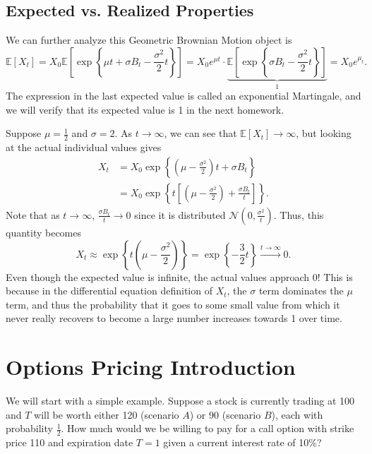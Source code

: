 \subsection{Expected vs. Realized Properties}
We can further analyze this Geometric Brownian Motion object is $$ \mathbb E[X_t] = X_0 \mathbb E \left[ \exp\left\{\mu t+\sigma B_t - \frac{\sigma^2}{2}t\right\} \right] = X_0 e^{\mu t} \cdot \underbrace{\mathbb E \left[ \exp \left\{ \sigma B_t - \frac{\sigma^2}{2} t \right\}  \right]}_{1} = X_0 e^{\mu_t}. $$ The expression in the last expected value is called an exponential Martingale, and we will verify that its expected value is 1 in the next homework. 

Suppose $\mu=\frac{1}{2}$ and $\sigma=2$. As $t\to\infty$, we can see that $\mathbb E[X_t]\to\infty$, but looking at the actual individual values gives \begin{align*} X_t &= X_0\exp \left\{ \left( \mu-\frac{\sigma^2}{2} \right) t + \sigma B_t \right\} \\
		&= X_0 \exp \left\{ t \left[ \left( \mu-\frac{\sigma^2}{2} \right) + \frac{\sigma B_t}{t} \right]  \right\} .
\end{align*} Note that as $t\to\infty$, $\frac{\sigma B_t}{t}\to 0$ since it is distributed $\mathcal N \left( 0,\frac{\sigma^2}{t} \right)$. Thus, this quantity becomes $$ X_t\approx \exp \left\{ t \left( \mu-\frac{\sigma^2}{2} \right)  \right\} = \exp \left\{ -\frac{3}{2}t \right\} \overset{t\to\infty}{\longrightarrow} 0. $$ Even though the expected value is infinite, the actual values approach 0! This is because in the differential equation definition of $X_t$, the $\sigma$ term dominates the $\mu$ term, and thus the probability that it goes to some small value from which it never really recovers to become a large number increases towards 1 over time.

\section{Options Pricing Introduction}
We will start with a simple example. Suppose a stock is currently trading at 100 and $T$ will be worth either 120 (scenario $A$) or 90 (scenario $B$), each with probability $\frac{1}{2}$. How much would we be willing to pay for a call option with strike price 110 and expiration date $T=1$ given a current interest rate of 10\%?

